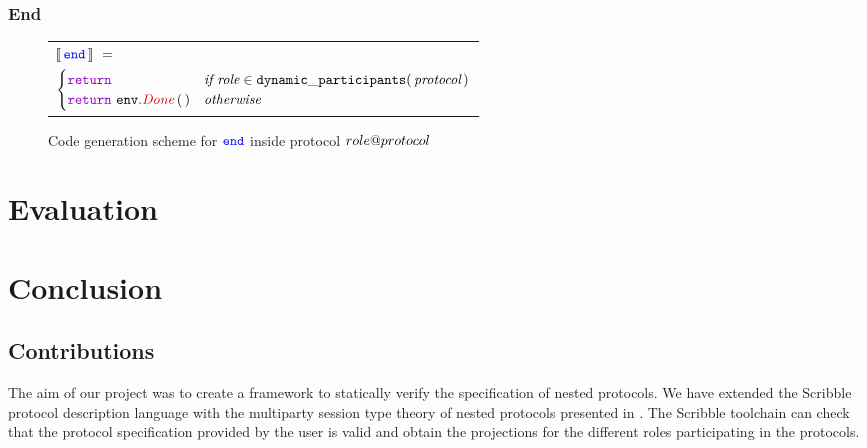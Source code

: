 \documentclass[12pt,twoside]{report}
\begin{document}
\subsection{End}
\begin{figure}[!h]
    \begin{center}
        \begin{tabular}{l}
            $\llbracket\,{\color{blue}\mathtt{end}}\,\rrbracket\ =\ $\\[3pt]
            \quad 
            \begin{math}
                \begin{cases}
                    \goreturn  & \textit{if}\ \textit{role} \in \mathtt{dynamic\_participants}(\,\textit{protocol}\,)\\
                    \goreturn\ \methodcall{\envparam}{Done}\,\emptyparams & \textit{otherwise}
                \end{cases}
            \end{math}
            
            
        \end{tabular}
    \end{center}
    \caption{Code generation scheme for ${\color{blue}\mathtt{end}}$ inside protocol ${role@protocol}$}
    \label{end-codegen}
\end{figure}



\chapter{Evaluation}


\chapter{Conclusion}
\section{Contributions}
The aim of our project was to create a framework to statically verify the specification of nested protocols. We have extended the Scribble protocol description language\cite{scribble} with the multiparty session type theory of nested protocols presented in \cite{nestedprotocols}. The Scribble toolchain can check that the protocol specification provided by the user is valid and obtain the projections for the different roles participating in the protocols.\\
\end{document}
